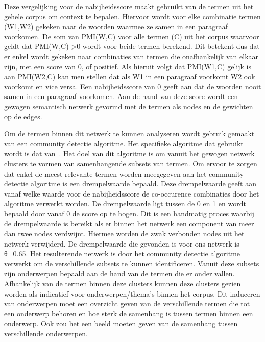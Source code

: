 
Deze vergelijking voor de nabijheidsscore maakt gebruikt van de termen uit het gehele corpus om context te bepalen. Hiervoor wordt voor elke combinatie termen (W1,W2) gekeken naar de woorden waarmee ze samen in een paragraaf voorkomen. De som van PMI(W,C) voor alle termen (C) uit het corpus waarvoor geldt dat PMI(W,C) \textgreater 0 wordt voor beide termen berekend. Dit betekent dus dat er enkel wordt gekeken naar combinaties van termen die onafhankelijk van elkaar zijn, met een score van 0, of  positief. Als hieruit volgt dat PMI(W1,C) gelijk is aan PMI(W2,C) kan men stellen dat als W1 in een paragraaf voorkomt W2 ook voorkomt en vice versa. Een nabijheidsscore van 0 geeft aan dat de woorden nooit samen in een paragraaf voorkomen. Aan de hand van deze score wordt een gewogen semantisch netwerk gevormd met de termen als nodes en de gewichten op de edges. 

Om de termen binnen dit netwerk te kunnen analyseren wordt gebruik gemaakt van een community detectie algoritme. Het specifieke algoritme dat gebruikt wordt is dat van~\cite{blondel2008fast}. Het doel van dit algoritme is om vanuit het gewogen netwerk clusters te vormen van samenhangende subsets van termen. Om ervoor te zorgen dat enkel de meest relevante termen worden meegegeven aan het community detectie algoritme is een drempelwaarde bepaald. Deze drempelwaarde geeft aan vanaf welke waarde voor de nabijheidsscore de co-occurence combinaties door het algoritme verwerkt worden. De drempelwaarde ligt tussen de 0 en 1 en wordt bepaald door vanaf 0 de score op te hogen. Dit is een handmatig proces waarbij de drempelwaarde is bereikt als er binnen het netwerk een component van meer dan twee nodes verdwijnt. Hiermee worden de zwak verbonden nodes uit het netwerk verwijderd. De drempelwaarde die gevonden is voor ons netwerk is θ=0.65. Het resulterende netwerk is door het community detectie algoritme verwerkt om de verschillende subsets te kunnen identificeren. Vanuit deze subsets zijn onderwerpen bepaald aan de hand van de termen die er onder vallen. Afhankelijk van de termen binnen deze clusters kunnen deze clusters gezien worden als indicatief voor onderwerpen/thema's binnen het corpus. Dit induceren van onderwerpen moet een overzicht geven van de verschillende termen die tot een onderwerp behoren en hoe sterk de samenhang is tussen termen binnen een onderwerp. Ook zou het een beeld moeten geven van de samenhang tussen verschillende onderwerpen. 

